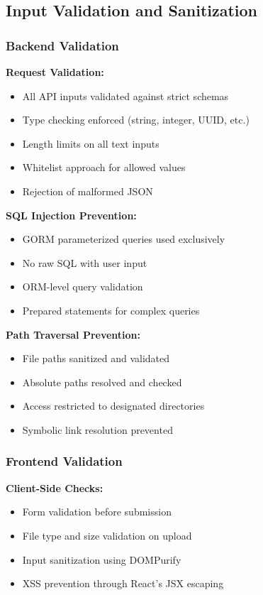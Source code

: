 \subsection{Input Validation and Sanitization}

\subsubsection{Backend Validation}

\textbf{Request Validation:}
\begin{itemize}
    \item All API inputs validated against strict schemas
    \item Type checking enforced (string, integer, UUID, etc.)
    \item Length limits on all text inputs
    \item Whitelist approach for allowed values
    \item Rejection of malformed JSON
\end{itemize}

\textbf{SQL Injection Prevention:}
\begin{itemize}
    \item GORM parameterized queries used exclusively
    \item No raw SQL with user input
    \item ORM-level query validation
    \item Prepared statements for complex queries
\end{itemize}

\textbf{Path Traversal Prevention:}
\begin{itemize}
    \item File paths sanitized and validated
    \item Absolute paths resolved and checked
    \item Access restricted to designated directories
    \item Symbolic link resolution prevented
\end{itemize}

\subsubsection{Frontend Validation}

\textbf{Client-Side Checks:}
\begin{itemize}
    \item Form validation before submission
    \item File type and size validation on upload
    \item Input sanitization using DOMPurify
    \item XSS prevention through React's JSX escaping
\end{itemize}

